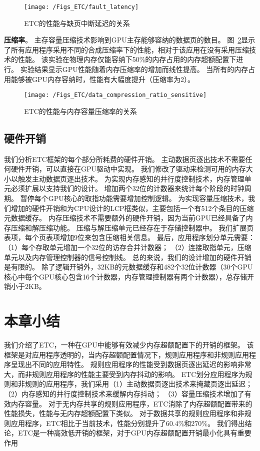 \begin{figure}[htbp] %
  \centering
  \texttt{[image: /Figs\_ETC/fault\_latency]}
  \caption{ETC的性能与缺页中断延迟的关系}
  \label{fig:fault_latency}
\end{figure}

\textbf{压缩率}。
主存容量压缩技术影响到GPU主存能够容纳的数据页的数目。
图~\ref{fig:data_compression_ratio_sensitive}显示了所有应用程序采用不同的合成压缩率下的性能，相对于该应用在没有采用压缩技术的性能。
该实验在物理内存仅能容纳下50\%的内存占用的内存超额配置下进行。
实验结果显示GPU性能随着内存压缩率的增加而线性提高。
当所有的内存占用能够被GPU内存容纳时，性能有大幅度提升（压缩率为2）。

\begin{figure}[htbp] %
  \centering
  \texttt{[image: /Figs\_ETC/data\_compression\_ratio\_sensitive]}
  \caption{ETC的性能与内存容量压缩率的关系}
  \label{fig:data_compression_ratio_sensitive}
\end{figure}

\subsection{硬件开销}
我们分析ETC框架的每个部分所耗费的硬件开销。
主动数据页逐出技术不需要任何硬件开销，可以直接在GPU驱动中实现。
我们修改了驱动来检测可用的内存大小以触发主动数据页逐出技术。
为实现内存感知的并行度控制技术，内存管理单元必须扩展以支持我们的设计。
增加两个32位的计数器来统计每个阶段的时钟周期。
暂停每个GPU核心的取指功能需要增加控制逻辑。
为实现容量压缩技术，我们增加的硬件开销和为CPU设计的LCP框类似，主要包括一个有512个条目的压缩元数据缓存。
内存压缩技术不需要额外的硬件开销，因为当前GPU已经具备了内存压缩和解压缩功能。
压缩与解压缩单元已经存在于存储控制器中。
我们扩展页表项，每个页表项增加9位来包含压缩相关信息。
最后，应用程序划分单元需要：
（1）每个存取单元增加一个32位的访存合并计数器；
（2）连接取指单元，压缩单元以及内存管理控制器的信号控制线。
总的来说，我们的设计增加的硬件开销是有限的。
除了逻辑开销外，32KB的元数据缓存和482个32位计数器（30个GPU核心中每个GPU核心包含16个计数器，内存管理控制器有两个计数器），总存储开销小于2KB。

\section{本章小结}
我们介绍了ETC，一种在GPU中能够有效减少内存超额配置下的开销的框架。
该框架是对应用程序透明的，当内存超额配置情况下，规则应用程序和非规则应用程序呈现出不同的应用特性。
规则应用程序的性能受到数据页逐出延迟的影响非常大，而非规则应用程序的性能主要受到内存抖动的影响。
ETC划分应用程序为规则和非规则的应用程序，我们采用（1）主动数据页逐出技术来掩藏页逐出延迟；
（2）内存感知的并行度控制技术来缓解内存抖动；
（3）容量压缩技术增加了有效内存容量。
对于无内存共享的规则应用程序，ETC消除了内存超额配置带来的性能损失，性能与无内存超额配置下类似。
对于数据共享的规则应用程序和非规则应用程序，ETC相比于当前技术，性能分别提升了60.4\%和270\%。
我们得出结论，ETC是一种高效低开销的框架，对于GPU内存超额配置开销最小化具有重要作用

